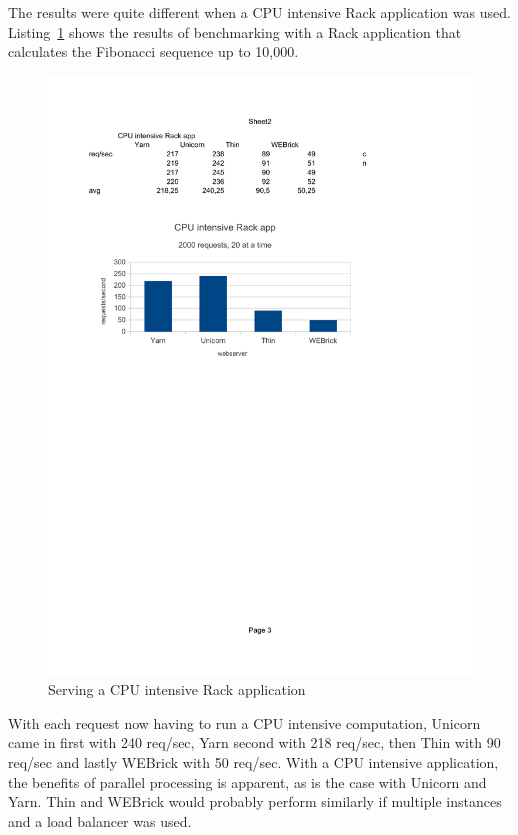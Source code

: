 The results were quite different when a CPU intensive Rack application was
used. Listing~\ref{cpubench} shows the results of benchmarking with a Rack
application that calculates the Fibonacci sequence up to 10,000.

\begin{figure}[htb]
  \centering
  \includegraphics[width=1.0\textwidth]{benchmark/cpu.pdf}
  \caption{Serving a CPU intensive Rack application}
  \label{cpubench}
\end{figure}

With each request now having to run a CPU intensive computation, Unicorn came in
first with 240 req/sec, Yarn second with 218 req/sec, then Thin with 90
req/sec and lastly WEBrick with 50 req/sec. With a CPU intensive application,
the benefits of parallel processing is apparent, as is the case with
Unicorn and Yarn. Thin and WEBrick would probably perform similarly if
multiple instances and a load balancer was used.

